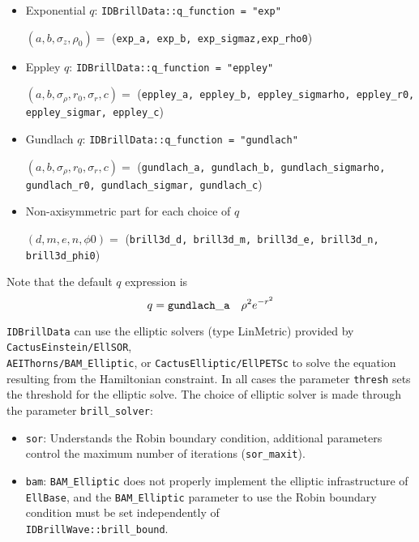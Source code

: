 \documentclass{article}
\begin{document}
\begin{itemize}

\item Exponential $q$: {\tt IDBrillData::q\_function = "exp"}

$(a, b,\sigma_z,\rho_0)=$ ({\tt exp\_a, exp\_b, exp\_sigmaz,exp\_rho0})

\item Eppley $q$: {\tt IDBrillData::q\_function = "eppley"}

$(a, b,\sigma_\rho, r_0,\sigma_r,c)=$ ({\tt eppley\_a, eppley\_b, eppley\_sigmarho, eppley\_r0, eppley\_sigmar, eppley\_c})

\item Gundlach $q$: {\tt IDBrillData::q\_function = "gundlach"}

$(a, b,\sigma_\rho, r_0,\sigma_r,c)=$ ({\tt gundlach\_a, gundlach\_b, gundlach\_sigmarho, gundlach\_r0, gundlach\_sigmar, gundlach\_c})

\item Non-axisymmetric part for each choice of $q$

$(d, m, e, n, \phi0)=$ ({\tt brill3d\_d, brill3d\_m, brill3d\_e, brill3d\_n, brill3d\_phi0})

\end{itemize}

Note that the default $q$ expression is
$$
q = {\tt gundlach\_a} \quad \rho^2 e^{-r^2} 
$$

{\tt IDBrillData} can use the elliptic solvers (type LinMetric)
provided by {\tt CactusEinstein/EllSOR},\\ {\tt AEIThorns/BAM\_Elliptic},
or {\tt CactusElliptic/EllPETSc} to solve the equation resulting from 
the Hamiltonian constraint. 
In all cases the parameter {\tt thresh} sets the threshold for the elliptic
solve. The choice of elliptic solver is made 
through the parameter {\tt brill\_solver}:

\begin{itemize}
  
\item {\tt sor}: Understands the Robin boundary condition, additional 
parameters control the maximum number of iterations ({\tt sor\_maxit}).
  
\item {\tt bam}: {\tt BAM\_Elliptic} does not properly implement the
elliptic infrastructure of {\tt EllBase}, and the {\tt BAM\_Elliptic}
parameter to use the Robin boundary condition must be set independently
of \\{\tt IDBrillWave::brill\_bound}.

\end{itemize}
\end{document}
